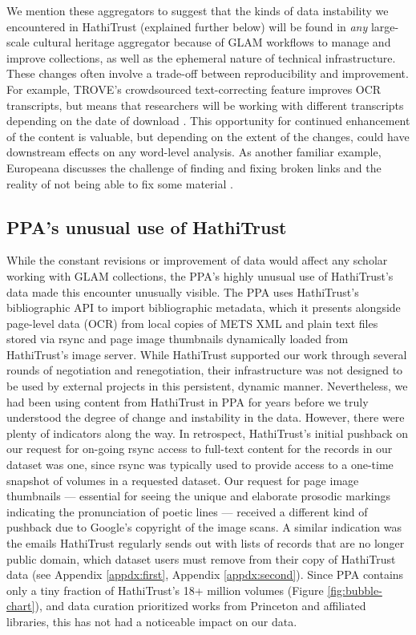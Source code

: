 \documentclass{anthology-ch}         %
\begin{document}
We mention these aggregators to suggest that the kinds of data instability we encountered in HathiTrust (explained further below) will be found in \textit{any }large-scale cultural heritage aggregator because of GLAM workflows to manage and improve collections, as well as the ephemeral nature of technical infrastructure. These changes often involve a trade-off between reproducibility and improvement. For example, TROVE’s crowdsourced text-correcting feature improves OCR transcripts, but means that researchers will be working with different transcripts depending on the date of download \cite{noauthor_text_nodate}. This opportunity for continued enhancement of the content is valuable, but depending on the extent of the changes, could have downstream effects on any word-level analysis. As another familiar example, Europeana discusses the challenge of finding and fixing broken links and the reality of not being able to fix some material \cite{noauthor_keeping_nodate}.

\subsection{PPA’s unusual use of HathiTrust}

While the constant revisions or improvement of data would affect any scholar working with GLAM collections, the PPA’s highly unusual use of HathiTrust’s data made this encounter unusually visible. The PPA uses HathiTrust’s bibliographic API to import bibliographic metadata, which it presents alongside page-level data (OCR) from local copies of METS XML and plain text files stored via rsync and page image thumbnails dynamically loaded from HathiTrust’s image server. While HathiTrust supported our work through several rounds of negotiation and renegotiation, their infrastructure was not designed to be used by external projects in this persistent, dynamic manner. Nevertheless, we had been using content from HathiTrust in PPA for years before we truly understood the degree of change and instability in the data. However, there were plenty of indicators along the way. In retrospect, HathiTrust’s initial pushback on our request for on-going rsync access to full-text content for the records in our dataset was one, since rsync was typically used to provide access to a one-time snapshot of volumes in a requested dataset. Our request for page image thumbnails — essential for seeing the unique and elaborate prosodic markings indicating the pronunciation of poetic lines — received a different kind of pushback due to Google’s copyright of the image scans. A similar indication was the emails HathiTrust regularly sends out with lists of records that are no longer public domain, which dataset users must remove from their copy of HathiTrust data (see Appendix \ref{appdx:first}, Appendix \ref{appdx:second}). Since PPA contains only a tiny fraction of HathiTrust’s 18+ million volumes (Figure \ref{fig:bubble-chart}), and data curation prioritized works from Princeton and affiliated libraries, this has not had a noticeable impact on our data.
\end{document}
